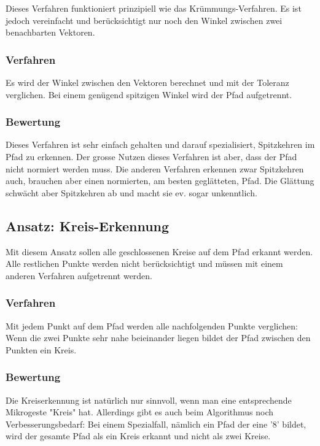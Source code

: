 Dieses Verfahren funktioniert prinzipiell wie das Krümmungs-Verfahren. Es ist jedoch vereinfacht und berücksichtigt nur noch den Winkel zwischen zwei benachbarten Vektoren.

\subsubsection{Verfahren}
Es wird der Winkel zwischen den Vektoren berechnet und mit der Toleranz verglichen. Bei einem genügend spitzigen Winkel wird der Pfad aufgetrennt.

\subsubsection{Bewertung}
Dieses Verfahren ist sehr einfach gehalten und darauf spezialisiert, Spitzkehren im Pfad zu erkennen. Der grosse Nutzen dieses Verfahren ist aber, dass der Pfad nicht normiert werden muss. Die anderen Verfahren erkennen zwar Spitzkehren auch, brauchen aber einen normierten, am besten geglätteten, Pfad. Die Glättung schwächt aber Spitzkehren ab und macht sie ev. sogar unkenntlich.  


\subsection{Ansatz: Kreis-Erkennung}
Mit diesem Ansatz sollen alle geschlossenen Kreise auf dem Pfad erkannt werden. Alle restlichen Punkte werden nicht berücksichtigt und müssen mit einem anderen Verfahren aufgetrennt werden.

\subsubsection{Verfahren}
Mit jedem Punkt auf dem Pfad werden alle nachfolgenden Punkte verglichen: Wenn die zwei Punkte sehr nahe beieinander liegen bildet der Pfad zwischen den Punkten ein Kreis.

\subsubsection{Bewertung}
Die Kreiserkennung ist natürlich nur sinnvoll, wenn man eine entsprechende Mikrogeste "Kreis" hat. Allerdings gibt es auch beim Algorithmus noch Verbesserungsbedarf: Bei einem Spezialfall, nämlich ein Pfad der eine '8' bildet, wird der gesamte Pfad als ein Kreis erkannt und nicht als zwei Kreise. 


